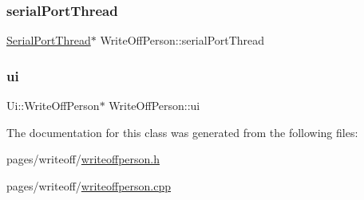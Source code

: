 \subsubsection{\texorpdfstring{serialPortThread}{serialPortThread}}
{\footnotesize\ttfamily \mbox{\hyperlink{class_serial_port_thread}{Serial\+Port\+Thread}}$\ast$ Write\+Off\+Person\+::serial\+Port\+Thread\hspace{0.3cm}{\ttfamily [private]}}

\mbox{\label{class_write_off_person_aaf19403b2f951f81bbd58c246247b64d}} 
\subsubsection{\texorpdfstring{ui}{ui}}
{\footnotesize\ttfamily Ui\+::\+Write\+Off\+Person$\ast$ Write\+Off\+Person\+::ui\hspace{0.3cm}{\ttfamily [private]}}



The documentation for this class was generated from the following files\+:\begin{DoxyCompactItemize}
\item 
pages/writeoff/\mbox{\hyperlink{writeoffperson_8h}{writeoffperson.\+h}}\item 
pages/writeoff/\mbox{\hyperlink{writeoffperson_8cpp}{writeoffperson.\+cpp}}\end{DoxyCompactItemize}
